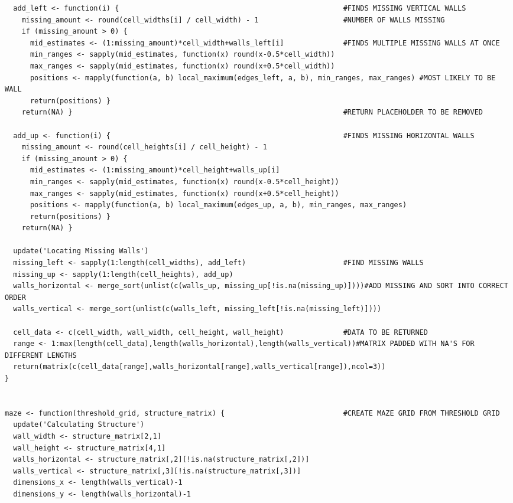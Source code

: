 \documentclass[titlepage]{article}
\begin{document}
\begin{changemargin}{-1in}{-1in}
\begin{verbatim}
  add_left <- function(i) {                                                     #FINDS MISSING VERTICAL WALLS
    missing_amount <- round(cell_widths[i] / cell_width) - 1                    #NUMBER OF WALLS MISSING
    if (missing_amount > 0) {
      mid_estimates <- (1:missing_amount)*cell_width+walls_left[i]              #FINDS MULTIPLE MISSING WALLS AT ONCE
      min_ranges <- sapply(mid_estimates, function(x) round(x-0.5*cell_width))
      max_ranges <- sapply(mid_estimates, function(x) round(x+0.5*cell_width))
      positions <- mapply(function(a, b) local_maximum(edges_left, a, b), min_ranges, max_ranges) #MOST LIKELY TO BE WALL
      return(positions) }
    return(NA) }                                                                #RETURN PLACEHOLDER TO BE REMOVED

  add_up <- function(i) {                                                       #FINDS MISSING HORIZONTAL WALLS
    missing_amount <- round(cell_heights[i] / cell_height) - 1
    if (missing_amount > 0) {
      mid_estimates <- (1:missing_amount)*cell_height+walls_up[i]
      min_ranges <- sapply(mid_estimates, function(x) round(x-0.5*cell_height))
      max_ranges <- sapply(mid_estimates, function(x) round(x+0.5*cell_height))
      positions <- mapply(function(a, b) local_maximum(edges_up, a, b), min_ranges, max_ranges)
      return(positions) }
    return(NA) }

  update('Locating Missing Walls')
  missing_left <- sapply(1:length(cell_widths), add_left)                       #FIND MISSING WALLS
  missing_up <- sapply(1:length(cell_heights), add_up)
  walls_horizontal <- merge_sort(unlist(c(walls_up, missing_up[!is.na(missing_up)])))#ADD MISSING AND SORT INTO CORRECT ORDER
  walls_vertical <- merge_sort(unlist(c(walls_left, missing_left[!is.na(missing_left)])))

  cell_data <- c(cell_width, wall_width, cell_height, wall_height)              #DATA TO BE RETURNED
  range <- 1:max(length(cell_data),length(walls_horizontal),length(walls_vertical))#MATRIX PADDED WITH NA'S FOR DIFFERENT LENGTHS
  return(matrix(c(cell_data[range],walls_horizontal[range],walls_vertical[range]),ncol=3))
}


maze <- function(threshold_grid, structure_matrix) {                            #CREATE MAZE GRID FROM THRESHOLD GRID
  update('Calculating Structure')
  wall_width <- structure_matrix[2,1]
  wall_height <- structure_matrix[4,1]
  walls_horizontal <- structure_matrix[,2][!is.na(structure_matrix[,2])]
  walls_vertical <- structure_matrix[,3][!is.na(structure_matrix[,3])]
  dimensions_x <- length(walls_vertical)-1
  dimensions_y <- length(walls_horizontal)-1


\end{verbatim}
\end{changemargin}
\end{document}

